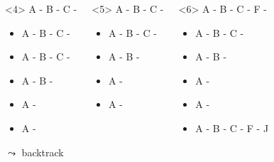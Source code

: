 \begin{frame}[fragile]
\begin{columns}[t]
\begin{onlyenv}<4>
 A - B - C - 

\begin{itemize}
\item  A - B  - C - 
\item  A - B  - C - 
\item  A - B - 
\item  A - 
\item  A - 
\end{itemize}

$\leadsto$ backtrack
\end{onlyenv}

\begin{onlyenv}<5>
 A - B  - C - 

\begin{itemize}
\item  A - B  - C - 
\item  A - B - 
\item  A - 
\item  A - 
\end{itemize}
\end{onlyenv}

\begin{onlyenv}<6>
 A - B - C - F - 

\begin{itemize}
\item  A - B  - C - 
\item  A - B - 
\item  A - 
\item  A - 
\end{itemize}

\begin{itemize}
\item  A - B - C - F - J
\end{itemize}
\end{onlyenv}




\end{columns}
\end{frame}
